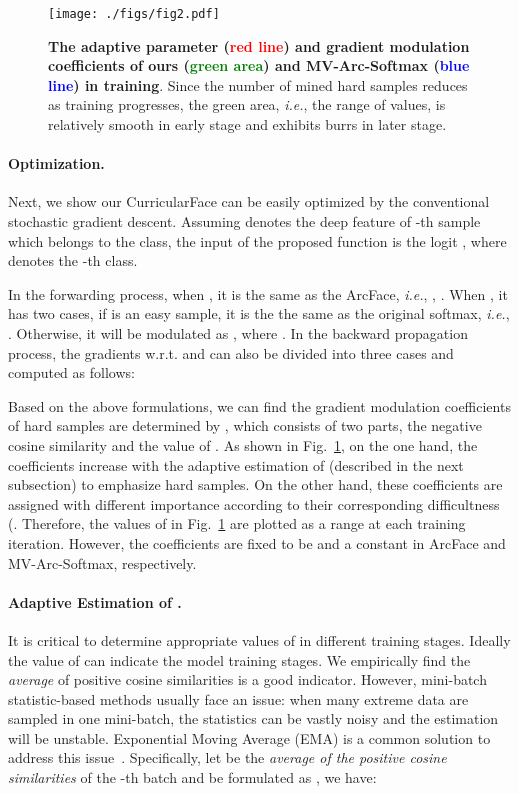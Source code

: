 \documentclass[10pt,twocolumn,letterpaper]{article}
\def\figvspace{{\vspace{-2mm}}}
\begin{document}
\begin{figure}[t!]
  \centering
  \texttt{[image: ./figs/fig2.pdf]}
\caption{\small \textbf{The adaptive parameter  (\textcolor{red}{red line}) and gradient modulation coefficients  of ours (\textcolor{green}{green area}) and MV-Arc-Softmax (\textcolor{blue}{blue line}) in training}. Since the number of mined hard samples reduces as training progresses, the green area, {\it i.e.}, the range of  values, is relatively smooth in early stage and exhibits burrs in later stage.
   }
    \label{fig:estimation_of_t}
    \figvspace
\end{figure}



\paragraph{Optimization.}
Next, we show our CurricularFace can be easily optimized by the conventional stochastic gradient descent.
Assuming  denotes the deep feature of -th sample which belongs to the  class, the input of the proposed function is the logit , where  denotes the -th class.

In the forwarding process, when , it is the same as the ArcFace, \textit{i.e.}, , . When , it has two cases, if  is an easy sample, it is the the same as the original softmax, \textit{i.e.}, . Otherwise, it will be modulated as , where .
In the backward propagation process, the gradients w.r.t.  and  can also be divided into three cases and computed as follows:

Based on the above formulations, we can find the gradient modulation coefficients of hard samples are determined by , which consists of two parts, the negative cosine similarity  and the value of . As shown in Fig.~\ref{fig:estimation_of_t}, on the one hand, the coefficients increase with the adaptive estimation of  (described in the next subsection) to emphasize hard samples. On the other hand, these coefficients are assigned with different importance according to their corresponding difficultness (. Therefore, the values of  in Fig.~\ref{fig:estimation_of_t} are plotted as a range at each training iteration. However, the coefficients are fixed to be  and a constant  in ArcFace and MV-Arc-Softmax, respectively.

\paragraph{Adaptive Estimation of .}
It is critical to determine appropriate values of  in different training stages.
Ideally the value of  can indicate the model training stages.
We empirically find the \textit{average} of positive cosine similarities is a good indicator.
However, mini-batch statistic-based methods usually face an issue: when many extreme data are sampled in one mini-batch, the statistics can be vastly noisy and the estimation will be unstable.
Exponential Moving Average (EMA) is a common solution to address this issue~\cite{li2019gradient}.
Specifically, let  be the \textit{average of the positive cosine similarities} of the -th batch and be formulated as , we have:
\end{document}
